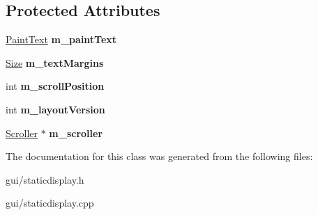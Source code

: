 \subsection*{Protected Attributes}
\begin{DoxyCompactItemize}
\item 
\hyperlink{classPaintText}{Paint\+Text} {\bfseries m\+\_\+paint\+Text}\hypertarget{classStaticDisplay_a9dbe507a189a6b1baf19e34219b01def}{}\label{classStaticDisplay_a9dbe507a189a6b1baf19e34219b01def}

\item 
\hyperlink{structSize}{Size} {\bfseries m\+\_\+text\+Margins}\hypertarget{classStaticDisplay_aa2b1e85ddb1e0c7341916830ff10d4f7}{}\label{classStaticDisplay_aa2b1e85ddb1e0c7341916830ff10d4f7}

\item 
int {\bfseries m\+\_\+scroll\+Position}\hypertarget{classStaticDisplay_acd38c053c44b58cd611584fd9c40a0e4}{}\label{classStaticDisplay_acd38c053c44b58cd611584fd9c40a0e4}

\item 
int {\bfseries m\+\_\+layout\+Version}\hypertarget{classStaticDisplay_a46f1f6829574292374e76fe7e7825287}{}\label{classStaticDisplay_a46f1f6829574292374e76fe7e7825287}

\item 
\hyperlink{classScroller}{Scroller} $\ast$ {\bfseries m\+\_\+scroller}\hypertarget{classStaticDisplay_addf10842298c0bfdabb50937747a04ca}{}\label{classStaticDisplay_addf10842298c0bfdabb50937747a04ca}

\end{DoxyCompactItemize}


The documentation for this class was generated from the following files\+:\begin{DoxyCompactItemize}
\item 
gui/staticdisplay.\+h\item 
gui/staticdisplay.\+cpp\end{DoxyCompactItemize}
